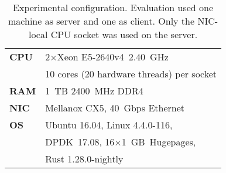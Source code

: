 \begin{table}[t]
\caption{Experimental configuration. Evaluation used
one machine as server and one as client.
Only the NIC-local CPU socket was used on the server.}
\vspace{21pt}
\centering
\begin{tabular}{p{} p{}}
\toprule
\textbf{CPU} & 2$\times$Xeon E5-2640v4~2.40~GHz\\
  & 10 cores (20 hardware threads) per socket
\\
\midrule
\textbf{RAM} & 1~TB 2400~MHz DDR4
\\
\midrule
\textbf{NIC} & Mellanox CX5, 40~Gbps Ethernet
\\
\midrule
\textbf{OS} & Ubuntu 16.04, Linux 4.4.0-116,\\
        & DPDK~17.08, 16$\times$1~GB~Hugepages,\\
        & Rust 1.28.0-nightly
\\
\bottomrule
\end{tabular}
\label{table:setup}
\end{table}
